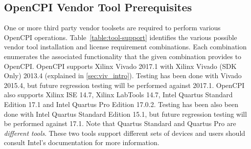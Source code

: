 \begin{flushleft}
\begin{landscape}
\section{OpenCPI Vendor Tool Prerequisites}
\label{sec:doc_overview}
One or more third party vendor toolsets are required to perform various OpenCPI operations. Table~\ref{table:tool-support} identifies the various possible vendor tool installation and license requirement combinations. Each combination enumerates the associated functionality that the given combination provides to OpenCPI. OpenCPI supports Xilinx Vivado 2017.1 with Xilinx Vivado (SDK Only) 2013.4 (explained in \ref{sec:viv_intro}). Testing has been done with Vivado 2015.4, but future regression testing will be performed against 2017.1. OpenCPI also supports Xilinx ISE 14.7, Xilinx LabTools 14.7, Intel Quartus Standard Edition 17.1 and Intel Quartus Pro Edition 17.0.2. Testing has been also been done with Intel Quartus Standard Edition 15.1, but future regression testing will be performed against 17.1. Note that Quartus Standard and Quartus Pro are \textit{different tools}. These two tools support different sets of devices and users should consult Intel's documentation for more information.


\end{landscape}
\end{flushleft}
